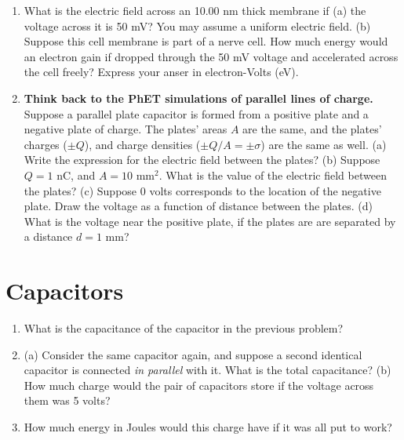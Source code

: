 \documentclass[10pt]{article}
\begin{document}
\begin{enumerate}
\item What is the electric field across an 10.00 nm thick membrane if (a) the voltage across it is 50 mV? You may assume a uniform electric field. (b) Suppose this cell membrane is part of a nerve cell.  How much energy would an electron gain if dropped through the 50 mV voltage and accelerated across the cell freely?  Express your anser in electron-Volts (eV). \\ \vspace{2cm}
\item \textbf{Think back to the PhET simulations of parallel lines of charge.}  Suppose a parallel plate capacitor is formed from a positive plate and a negative plate of charge.  The plates' areas $A$ are the same, and the plates' charges ($\pm Q$), and charge densities ($\pm Q/A = \pm \sigma$) are the same as well. (a) Write the expression for the electric field between the plates? (b) Suppose $Q = 1$ nC, and $A = 10$ mm$^2$.  What is the value of the electric field between the plates?  (c) Suppose 0 volts corresponds to the location of the negative plate.  Draw the voltage as a function of distance between the plates.  (d) What is the voltage near the positive plate, if the plates are are separated by a distance $d = 1$ mm? \\ \vspace{1.75cm}
\end{enumerate}

\section{Capacitors}

\begin{enumerate}
\item What is the capacitance of the capacitor in the previous problem? \\ \vspace{1cm}
\item (a) Consider the same capacitor again, and suppose a second identical capacitor is connected \textit{in parallel} with it.  What is the total capacitance? (b) How much charge would the pair of capacitors store if the voltage across them was 5 volts? \\ \vspace{1.5cm}
\item How much energy in Joules would this charge have if it was all put to work?
\end{enumerate}
\end{document}
